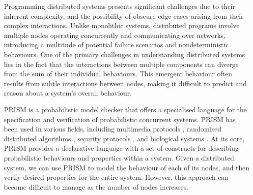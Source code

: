 Programming distributed systems
%
presents significant challenges due to their inherent complexity, and
the possibility of obscure edge cases arising from their complex
interactions.
%
Unlike monolithic systems, distributed programs involve multiple nodes
operating concurrently and communicating over networks, introducing a
multitude of potential failure scenarios and nondeterministic
behaviours.
%
One of the primary challenges in understanding distributed systems
lies in the fact that the interactions between multiple components can
diverge from the sum of their individual behaviours. This emergent
behaviour often results from subtle interactions between nodes, making
it difficult to predict and reason about a system's overall behaviour.

PRISM \cite{PRISMdoc} is a probabilistic model checker that offers a
specialised language for the specification and verification of
probabilistic concurrent systems. PRISM has been used in various
fields, including multimedia protocols \cite{multimedia}, randomised
distributed algorithms \cite{distr1,distr2}, security protocols
\cite{security1,security2}, and biological systems \cite{bio1,bio2}.
At its core, PRISM provides a declarative language with a set of
constructs for describing probabilistic behaviours and properties
within a system.
%
Given a distributed system, we can use PRISM to model the behaviour of
each of its nodes,
and then verify desired properties for the entire system. However,
this approach can become difficult to manage as the number of nodes
increases.

%

